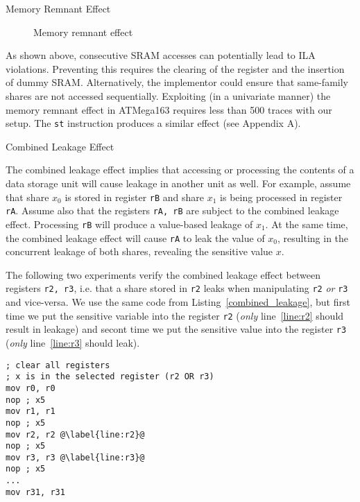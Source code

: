 \begin{subsection}{Memory Remnant Effect}
\begin{figure}[H]
\caption{Memory remnant effect}\label{fig:regleak}
\end{figure}

As shown above, consecutive SRAM accesses can potentially lead to ILA violations. Preventing this requires the clearing of the register and the insertion of dummy SRAM. Alternatively, the implementor could ensure that same-family shares are not accessed sequentially. Exploiting (in a univariate manner) the memory remnant effect in ATMega163 requires less than 500 traces with our setup. The \texttt{st} instruction produces a similar effect (see Appendix A).
\end{subsection}

\begin{subsection}{Combined Leakage Effect}\label{combined_leakage}

The combined leakage effect implies that accessing or processing the contents of a data storage unit will cause leakage in another unit as well. For example, assume that share $x_0$ is stored in register \texttt{rB} and share $x_1$ is being processed in register \texttt{rA}. Assume also that the registers \texttt{rA, rB} are subject to the combined leakage effect. Processing \texttt{rB} will produce a value-based leakage of $x_1$. At the same time, the combined leakage effect will cause \texttt{rA} to leak the value of $x_0$, resulting in the concurrent leakage of both shares, revealing the sensitive value $x$.

The following two experiments verify the combined leakage effect between registers \texttt{r2, r3}, i.e. that a share stored in \texttt{r2} leaks when manipulating \texttt{r2} \emph{or} \texttt{r3} and vice-versa.
We use the same code from Listing~\ref{combined_leakage}, but first time we put the sensitive variable into the register \texttt{r2} (\emph{only} line~\ref{line:r2} should result in leakage)
and secont time we put the sensitive value into the register 
\texttt{r3} (\emph{only} line~\ref{line:r3} should leak).

\begin{lstlisting}
; clear all registers
; x is in the selected register (r2 OR r3)
mov r0, r0
nop ; x5
mov r1, r1
nop ; x5 
mov r2, r2 @\label{line:r2}@
nop ; x5
mov r3, r3 @\label{line:r3}@
nop ; x5
...
mov r31, r31 
\end{lstlisting}


\end{subsection}
